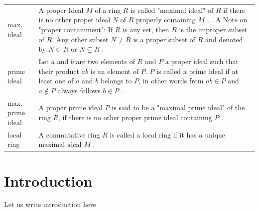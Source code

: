 \documentclass[12pt]{amsart}
\theoremstyle{definition}
\begin{document}
{\begin{table}[H]
\begin{tabular}{|P{1.4cm} p{13.4cm}|}
		\\
		max. ideal & A proper Ideal $M$ of a ring $R$ is called "maximal ideal" of $R$  if there is no other proper ideal $N$ of $R$ properly containing $M$ \cite[p.~247]{Ref_Fraleigh_2014}, \cite[p.~37]{Ref_Northcott_1953}. A Note on "proper containment": If $R$ is any set, then $R$ is the improper subset of $R$. Any other subset $N\ne R$ is a proper subset of $R$ and denoted by $N\subset R$ or $N\varsubsetneq R$ \cite[p.~2]{Ref_Fraleigh_2014}.
		\\
		prime ideal & Let $a$ and $b$ are two elements of $R$ and $P$ a proper ideal such that their product $ab$ is an element of $P$. $P$ is called a prime ideal if at least one of $a$ and $b$ belongs to $P$, in other words from $ab\in P$ and $a\notin P$ always follows $b\in P$ \cite[p.~9]{Ref_Northcott_1953}.
		\\
		max. prime ideal & A proper prime ideal $P$ is said to be a "maximal prime ideal" of the ring $R$, if there is no other proper prime ideal containing $P$ \cite[p.~23]{Ref_Northcott_1953}.
		\\
		local ring & A commutative ring $R$ is called a local ring if it has a unique maximal ideal $M$ \cite[p.~522]{Ref_Rotman_2005}.
		\\ \hline
	\end{tabular}
\end{table}}

\section{Introduction}
\label{introduction}
Let us write introduction here

\vspace{1em}


\end{document}
